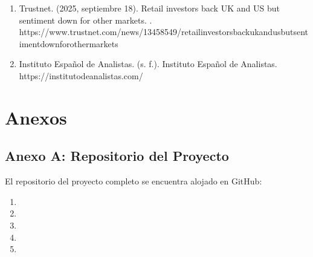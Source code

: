 \documentclass[letterpaper,10pt,spanish]{sphinxmanual}
\begin{document}
\begin{enumerate}
\item {} 
\sphinxAtStartPar
Trustnet. (2025, septiembre 18). Retail investors back UK and US but sentiment down for other markets. . https://www.trustnet.com/news/13458549/retail\sphinxhyphen{}investors\sphinxhyphen{}back\sphinxhyphen{}uk\sphinxhyphen{}and\sphinxhyphen{}us\sphinxhyphen{}but\sphinxhyphen{}sentiment\sphinxhyphen{}down\sphinxhyphen{}for\sphinxhyphen{}other\sphinxhyphen{}markets

\item {} 
\sphinxAtStartPar
Instituto Español de Analistas. (s. f.). Instituto Español de Analistas. https://institutodeanalistas.com/

\end{enumerate}

\sphinxstepscope


\chapter{Anexos}
\label{\detokenize{Anexos:anexos}}\label{\detokenize{Anexos::doc}}

\section{Anexo A: Repositorio del Proyecto}
\label{\detokenize{Anexos:anexo-a-repositorio-del-proyecto}}
\sphinxAtStartPar
El repositorio del proyecto completo se encuentra alojado en GitHub:
\begin{enumerate}
%
\item {} 
\sphinxAtStartPar
{}

\item {} 
\sphinxAtStartPar
{}

\item {} 
\sphinxAtStartPar
{}

\item {} 
\sphinxAtStartPar
{}

\item {} 
\sphinxAtStartPar
{}

\end{enumerate}
\end{document}
